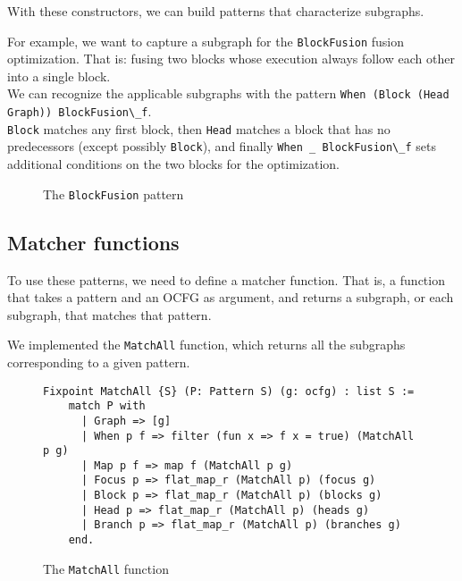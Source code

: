 \documentclass[11pt]{article}
\newcommand{\inlinecoq}[1]{\mbox{\lstinline[style=customcoq,columns=fixed,basewidth=.48em]{#1}}}
\newcommand{\ilc}[1]{\inlinecoq{#1}}
\begin{document}
With these constructors, we can build patterns that characterize subgraphs.

For example, we want to capture a subgraph for the \ilc{BlockFusion} fusion optimization. That is: fusing two blocks whose execution always follow each other into a single block.\\
We can recognize the applicable subgraphs with the pattern \ilc{When (Block (Head Graph)) BlockFusion\_f}.\\
\ilc{Block} matches any first block, then \ilc{Head} matches a block that has no predecessors (except possibly \ilc{Block}), and finally \ilc{When _ BlockFusion\_f} sets additional conditions on the two blocks for the optimization.
\begin{figure}[h]
  \caption{The \ilc{BlockFusion} pattern}
\end{figure}

\subsection{Matcher functions}

To use these patterns, we need to define a matcher function. That is, a function that takes a pattern and an OCFG as argument, and returns a subgraph, or each subgraph, that matches that pattern.

We implemented the \ilc{MatchAll} function, which returns all the subgraphs corresponding to a given pattern.

\begin{figure}[H]
  \label{fig:match}
  \begin{lstlisting}[style=customcoq,basicstyle=\small\ttfamily]
    Fixpoint MatchAll {S} (P: Pattern S) (g: ocfg) : list S :=
    match P with
      | Graph => [g]
      | When p f => filter (fun x => f x = true) (MatchAll p g) 
      | Map p f => map f (MatchAll p g)
      | Focus p => flat_map_r (MatchAll p) (focus g)
      | Block p => flat_map_r (MatchAll p) (blocks g)
      | Head p => flat_map_r (MatchAll p) (heads g)
      | Branch p => flat_map_r (MatchAll p) (branches g)
    end.
  \end{lstlisting}
  \caption{The \ilc{MatchAll} function}
\end{figure}
\end{document}
